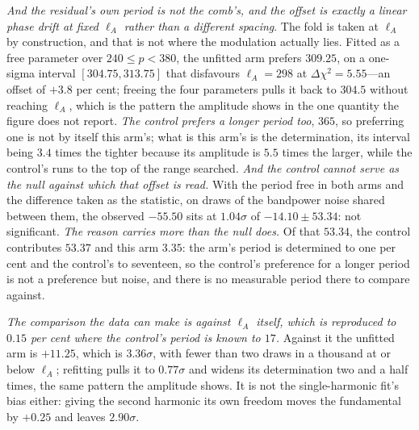 \documentclass[11pt,a4paper]{article}
\theoremstyle{plain}
\theoremstyle{definition}
\theoremstyle{remark}
\begin{document}
\emph{And the residual's own period is not the comb's, and the offset is exactly a linear phase drift at fixed $\ell_{A}$ rather than a different spacing}. The
fold is taken at $\ell_{A}$ by construction, and that is not where the modulation
actually lies. Fitted as a free parameter over $240\le p<380$, the unfitted arm prefers $309.25$, on a
one-sigma interval $[304.75,313.75]$ that disfavours $\ell_{A}=298$ at $\Delta\chi^{2}=5.55$---an offset of
$+3.8$ per cent; freeing the four parameters pulls it back to $304.5$ without reaching $\ell_{A}$, which is
the pattern the amplitude shows in the one quantity the figure does not report. \emph{The control prefers a
longer period too}, $365$, so preferring one is not by itself this arm's; what is this arm's is the
determination, its interval being $3.4$ times the tighter because its amplitude is $5.5$ times the larger,
while the control's runs to the top of the range searched.
\emph{And the control cannot serve as the null against which that offset is read.} With the period free in
both arms and the difference taken as the statistic, on draws of the bandpower noise shared between them,
the observed $-55.50$ sits at $1.04\sigma$ of $-14.10\pm53.34$: not significant. \emph{The reason carries
more than the null does.} Of that $53.34$, the control contributes $53.37$ and this arm $3.35$: the arm's
period is determined to one per cent and the control's to seventeen, so the control's preference for a longer
period is not a preference but noise, and there is no measurable period there to compare against.

\emph{The comparison the data can make is against $\ell_{A}$ itself, which is reproduced to $0.15$ per cent
where the control's period is known to $17$.} Against it the unfitted arm is $+11.25$, which is
$3.36\sigma$, with fewer than two draws in a thousand at or below $\ell_{A}$; refitting pulls it to
$0.77\sigma$ and widens its determination two and a half times, the same pattern the amplitude shows. It is not the
single-harmonic fit's bias either: giving the second harmonic its own freedom moves the fundamental by
$+0.25$ and leaves $2.90\sigma$.
\end{document}
